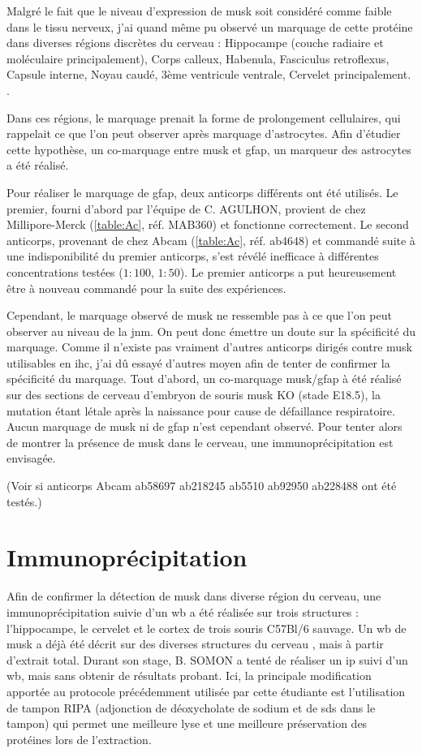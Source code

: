 	Malgré le fait que le niveau d'expression de \gls{musk} soit considéré comme faible dans le tissu nerveux, j'ai quand même pu observé un marquage de cette protéine dans diverses régions discrètes du cerveau : Hippocampe (couche radiaire et moléculaire principalement), Corps calleux, Habenula, Fasciculus retroflexus, Capsule interne, Noyau caudé, 3ème ventricule ventrale, Cervelet principalement. .
	
	Dans ces régions, le marquage prenait la forme de prolongement cellulaires, qui rappelait ce que l'on peut observer après marquage d'astrocytes. Afin d'étudier cette hypothèse, un co-marquage entre \gls{musk} et \acrshort{gfap}, un marqueur des astrocytes a été réalisé.
	
	Pour réaliser le marquage de \acrshort{gfap}, deux anticorps différents ont été utilisés. Le premier, fourni d'abord par l'équipe de C. AGULHON, provient de chez Millipore-Merck (\cref{table:Ac}, réf. MAB360) et fonctionne correctement. Le second anticorps, provenant de chez Abcam (\cref{table:Ac}, réf. ab4648) et commandé suite à une indisponibilité du premier anticorps, s'est révélé inefficace à différentes concentrations testées ($1{:}100$, $1{:}50$). Le premier anticorps a put heureusement être à nouveau commandé pour la suite des expériences.
	
	Cependant, le marquage observé de \gls{musk} ne ressemble pas à ce que l'on peut observer au niveau de la \gls{jnm}.  On peut donc émettre un doute sur la spécificité du marquage. Comme il n'existe pas vraiment d'autres anticorps dirigés contre \gls{musk} utilisables en \gls{ihc}, j'ai dû essayé d'autres moyen afin de tenter de confirmer la spécificité du marquage. Tout d'abord, un co-marquage \gls{musk}/\acrshort{gfap} à été réalisé sur des sections de cerveau d'embryon de souris \gls{musk} KO (stade E18.5), la mutation étant létale après la naissance pour cause de défaillance respiratoire. Aucun marquage de \gls{musk} ni de \acrshort{gfap} n'est cependant observé. Pour tenter alors de montrer la présence de \gls{musk} dans le cerveau, une immunoprécipitation est envisagée.
	
	(Voir si anticorps Abcam ab58697 ab218245 ab5510 ab92950 ab228488 ont été testés.)

\section{Immunoprécipitation}
\label{sec:IPresultat}
	Afin de confirmer la détection de \gls{musk} dans diverse région du cerveau, une immunoprécipitation suivie d'un \gls{wb} a été réalisée sur trois structures : l'hippocampe, le cervelet et le cortex de trois souris C57Bl/6 sauvage. Un \gls{wb} de \gls{musk} a déjà été décrit sur des diverses structures du cerveau \cite{Garcia-Osta2006}, mais à partir d'extrait total. Durant son stage, B. SOMON a tenté de réaliser un \gls{ip} suivi d'un \gls{wb}, mais sans obtenir de résultats probant. Ici, la principale modification apportée au protocole précédemment utilisée par cette étudiante est l'utilisation de tampon RIPA (adjonction de déoxycholate de sodium et de \acrshort{sds} dans le tampon) qui permet une meilleure lyse et une meilleure préservation des protéines lors de l'extraction.
	
